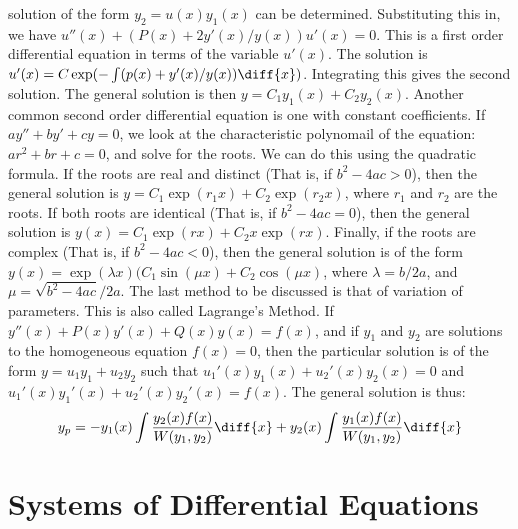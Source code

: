         solution of the form $y_{2}=u(x)y_{1}(x)$ can be
        determined. Substituting this in, we have
        $u''(x)+(P(x)+2y'(x)/y(x))u'(x)=0$. This is a first
        order differential equation in terms of the variable
        $u'(x)$. The solution is
        $u'(x)=C\exp(-\int(p(x)+y'(x)/y(x))\diff{x})$.
        Integrating this gives the second solution.
        The general solution is then
        $y=C_{1}y_{1}(x)+C_{2}y_{2}(x)$. Another common
        second order differential equation is one with
        constant coefficients. If 
        $ay''+by'+cy=0$, we look at the characteristic
        polynomail of the equation:
        $ar^{2}+br+c=0$, and solve for the roots. We
        can do this using the quadratic formula. If
        the roots are real and distinct (That is,
        if $b^{2}-4ac>0$), then the general solution
        is $y=C_{1}\exp(r_{1}x)+C_{2}\exp(r_{2}x)$,
        where $r_{1}$ and $r_{2}$ are the roots. If
        both roots are identical (That is,
        if $b^{2}-4ac=0$), then the general solution
        is $y(x)=C_{1}\exp(rx)+C_{2}x\exp(rx)$. Finally,
        if the roots are complex (That is, if
        $b^{2}-4ac<0$), then the general solution is of
        the form
        $y(x)=\exp(\lambda{x})(C_{1}\sin(\mu{x})+C_{2}\cos(\mu{x})$,
        where $\lambda=b/2a$, and $\mu=\sqrt{b^{2}-4ac}/2a$.
        The last method to be discussed is that of
        variation of parameters. This is also called
        Lagrange's Method. If $y''(x)+P(x)y'(x)+Q(x)y(x)=f(x)$,
        and if $y_{1}$ and $y_{2}$ are solutions
        to the homogeneous equation $f(x)=0$, then the particular
        solution is of the form $y=u_{1}y_{1}+u_{2}y_{2}$ such
        that $u_{1}'(x)y_{1}(x)+u_{2}'(x)y_{2}(x)=0$
        and $u_{1}'(x)y_{1}'(x)+u_{2}'(x)y_{2}'(x)=f(x)$.
        The general solution is thus:
        \begin{equation*}
            y_{p}=
            -y_{1}(x)\int\frac{y_{2}(x)f(x)}{W(y_{1},y_{2})}\diff{x}
            +y_{2}(x)\int\frac{y_{1}(x)f(x)}{W(y_{1},y_{2})}\diff{x}
        \end{equation*}
    \section{Systems of Differential Equations}
